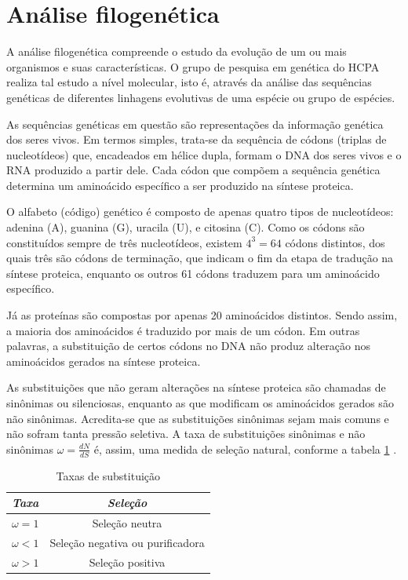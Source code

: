 \documentclass[cic,tc]{iiufrgs}
\begin{document}
\section{Análise filogenética}
\label{sec:filo}

A análise filogenética compreende o estudo da evolução de um ou mais organismos
e suas características. O grupo de pesquisa em genética do HCPA realiza tal
estudo a nível molecular, isto é, através da análise das sequências genéticas
de diferentes linhagens evolutivas de uma espécie ou grupo de espécies.

As sequências genéticas em questão são representações da informação genética
dos seres vivos. Em termos simples, trata-se da sequência de códons (triplas de
nucleotídeos) que, encadeados em hélice dupla, formam o DNA dos seres vivos e o
RNA produzido a partir dele. Cada códon que compõem a sequência genética
determina um aminoácido específico a ser produzido na síntese proteica.

O alfabeto (código) genético é composto de apenas quatro tipos de nucleotídeos:
adenina (A), guanina (G), uracila (U), e citosina (C). Como os códons são
constituídos sempre de três nucleotídeos, existem $4^3 = 64$ códons distintos,
dos quais três são códons de terminação, que indicam o fim da etapa de tradução
na síntese proteica, enquanto os outros 61 códons traduzem para um aminoácido
específico.

Já as proteínas são compostas por apenas 20 aminoácidos distintos. Sendo assim,
a maioria dos aminoácidos é traduzido por mais de um códon. Em outras palavras,
a substituição de certos códons no DNA não produz alteração nos aminoácidos
gerados na síntese proteica.

As substituições que não geram alterações na síntese proteica são chamadas de
sinônimas ou silenciosas, enquanto as que modificam os aminoácidos gerados são
não sinônimas. Acredita-se que as substituições sinônimas sejam mais comuns e
não sofram tanta pressão seletiva. A taxa de substituições sinônimas e não
sinônimas $\omega = \frac{dN}{dS}$ é, assim, uma medida de seleção natural,
conforme a tabela \ref{tbl:ex1} \cite{yang2002codon}.

\begin{table}[h]
    \caption{Taxas de substituição}
    \centering
        \begin{tabular}{c|c}
          \hline
          \textit{Taxa}  &   \textit{Seleção} \\
          \hline
          \hline
          $\omega = 1$ & Seleção neutra \\
          $\omega < 1$ & Seleção negativa ou purificadora \\
          $\omega > 1$ & Seleção positiva \\
          \hline
        \end{tabular}
    \label{tbl:ex1}
\end{table}
\end{document}
